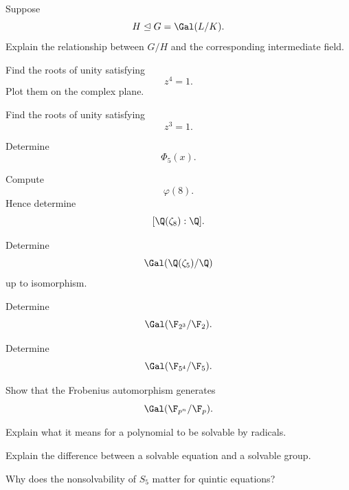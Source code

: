 \begin{exercise}[2]
Suppose
\[ H\trianglelefteq G=\Gal(L/K). \]
Explain the relationship between \(G/H\) and the corresponding intermediate
field.
\end{exercise}

\begin{exercise}[2]
Find the roots of unity satisfying
\[ z^4=1. \]
Plot them on the complex plane.
\end{exercise}

\begin{exercise}[2]
Find the roots of unity satisfying
\[ z^3=1. \]
\end{exercise}

\begin{exercise}[2]
Determine
\[ \Phi_5(x). \]
\end{exercise}

\begin{exercise}[2]
Compute
\[ \varphi(8). \]
Hence determine
\[ [\Q(\zeta_8):\Q]. \]
\end{exercise}

\begin{exercise}[3]
Determine
\[ \Gal(\Q(\zeta_5)/\Q) \]
up to isomorphism.
\end{exercise}

\begin{exercise}[2]
Determine
\[ \Gal(\F_{2^3}/\F_2). \]
\end{exercise}

\begin{exercise}[2]
Determine
\[ \Gal(\F_{5^4}/\F_5). \]
\end{exercise}

\begin{exercise}[3]
Show that the Frobenius automorphism generates
\[ \Gal(\F_{p^n}/\F_p). \]
\end{exercise}

\begin{exercise}[2]
Explain what it means for a polynomial to be solvable by radicals.
\end{exercise}

\begin{exercise}[2]
Explain the difference between a solvable equation and a solvable group.
\end{exercise}

\begin{exercise}[2]
Why does the nonsolvability of \(S_5\) matter for quintic equations?
\end{exercise}

